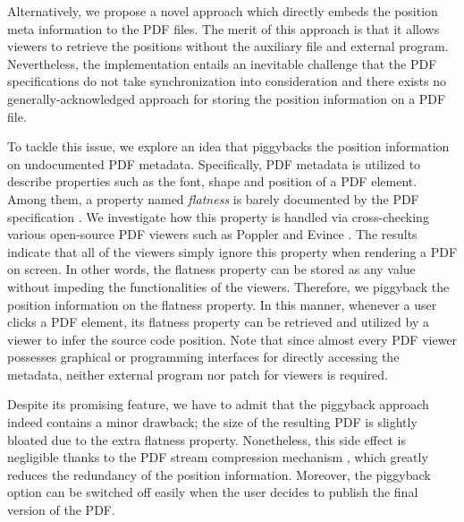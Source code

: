 \documentclass[sigconf]{acmart}
\newcommand{\todo}[1]{\textbf{\{TODO: #1\}}}
\begin{document}
Alternatively, we propose a novel approach which directly embeds the position meta information to the PDF files. 
The merit of this approach is that it allows viewers to retrieve the positions without the auxiliary file and external program. 
Nevertheless, the implementation entails an inevitable challenge that the PDF specifications do not take synchronization into consideration and there exists no generally-acknowledged approach for storing the position information on a PDF file. 

To tackle this issue, we explore an idea that piggybacks the position information on undocumented PDF metadata. 
Specifically, PDF metadata is utilized to describe properties such as the font, shape and position of a PDF element. 
Among them, a property named \textit{flatness} is barely documented by the PDF specification \cite{libpdf2008}. 
We investigate how this property is handled via cross-checking various open-source PDF viewers such as Poppler\cite{libpoppler2008} and Evince \cite{libevince}. 
The results indicate that all of the viewers simply ignore this property when rendering a PDF on screen. 
In other words, the flatness property can be stored as any value without impeding the functionalities of the viewers. 
Therefore, we piggyback the position information on the flatness property.
In this manner, whenever a user clicks a PDF element, its flatness property can be retrieved and utilized  by a viewer to infer the source code position. 
Note that since almost every PDF viewer possesses graphical or programming interfaces for directly accessing the metadata, neither external program nor patch for viewers is required. 

Despite its promising feature, we have to admit that the piggyback approach indeed contains a minor drawback; the size of the resulting PDF is slightly bloated due to the extra flatness property. 
Nonetheless, this side effect is negligible thanks to the PDF stream compression mechanism \cite{libpdf2008}, which greatly reduces the redundancy of the position information. 
Moreover, the piggyback option can be  switched off easily when the user decides to publish the final version of the PDF.



\end{document}
